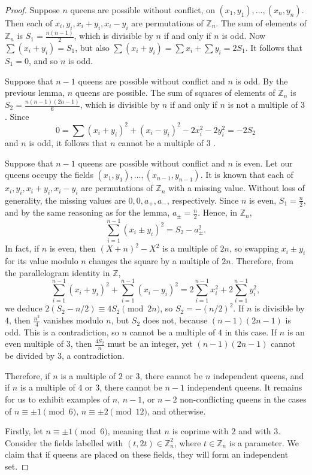 \documentclass[11pt]{article}
\begin{document}
\begin{proof} Suppose $n$ queens are possible without conflict, on $(x_1,y_1),\dots,(x_n,y_n)$. Then each of $x_i,y_i,x_i+y_i,x_i-y_i$ are permutations of $\mathbb{Z}_n$. The sum of elements of $\mathbb{Z}_n$ is $S_1=\frac{n(n-1)}{2}$, which is divisible by $n$ if and only if $n$ is odd. Now $\sum(x_i+y_i)=S_1$, but also $\sum(x_i+y_i)=\sum x_i+\sum y_i=2S_1$. It follows that $S_1=0$, and so $n$ is odd.

Suppose that $n-1$ queens are possible without conflict and $n$ is odd. By the previous lemma, $n$ queens are possible. The sum of squares of elements of $\mathbb{Z}_n$ is $S_2=\frac{n(n-1)(2n-1)}{6}$, which is divisible by $n$ if and only if $n$ is not a multiple of $3$. Since
$$0=\sum(x_i+y_i)^2+(x_i-y_i)^2-2x_i^2-2y_i^2=-2S_2$$
and $n$ is odd, it follows that $n$ cannot be a multiple of $3$ \cite{Pol}.

Suppose that $n-1$ queens are possible without conflict and $n$ is even. Let our queens occupy the fields $(x_1,y_1),\dots,(x_{n-1},y_{n-1})$. It is known that each of $x_i,y_i,x_i+y_i,x_i-y_i$ are permutations of $\mathbb{Z}_n$ with a missing value. Without loss of generality, the missing values are $0,0,a_+,a_-$, respectively. Since $n$ is even, $S_1=\frac n2$, and by the same reasoning as for the lemma, $a_\pm =\frac n2$. Hence, in $\mathbb{Z}_n$,
$$\sum_{i=1}^{n-1}(x_i\pm y_i)^2= S_2-a_\pm^2.$$
In fact, if $n$ is even, then $(X+n)^2-X^2$ is a multiple of $2n$, so swapping $x_i\pm y_i$ for its value modulo $n$ changes the square by a multiple of $2n$. Therefore, from the parallelogram identity in $\mathbb{Z}$,
$$\sum_{i=1}^{n-1}(x_i+y_i)^2+\sum_{i=1}^{n-1}(x_i-y_i)^2=2\sum_{i=1}^{n-1}x_i^2+2\sum_{i=1}^{n-1}y_i^2,$$
we deduce $2\left(S_2-n/2\right)\equiv 4S_2\pmod {2n}$, so $S_2=-(n/2)^2$. If $n$ is divisible by $4$, then $\frac{n^2}{4}$ vanishes modulo $n$, but $S_2$ does not, because $(n-1)(2n-1)$ is odd. This is a contradiction, so $n$ cannot be a multiple of $4$ in this case. If $n$ is an even multiple of $3$, then $\frac{4S_2}{n}$ must be an integer, yet $(n-1)(2n-1)$ cannot be divided by $3$, a contradiction.

Therefore, if $n$ is a multiple of $2$ or $3$, there cannot be $n$ independent queens, and if $n$ is a multiple of $4$ or $3$, there cannot be $n-1$ independent queens. It remains for us to exhibit examples of $n$, $n-1$, or $n-2$ non-conflicting queens in the cases of $n\equiv \pm 1\pmod 6$, $n\equiv \pm 2\pmod{12}$, and otherwise.

Firstly, let $n\equiv \pm1 \pmod 6$, meaning that $n$ is coprime with $2$ and with $3$. Consider the fields labelled with $(t,2t)\in \mathbb{Z}_n^2$, where $t\in\mathbb{Z}_n$ is a parameter. We claim that if queens are placed on these fields, they will form an independent set.


\end{proof}
\end{document}
